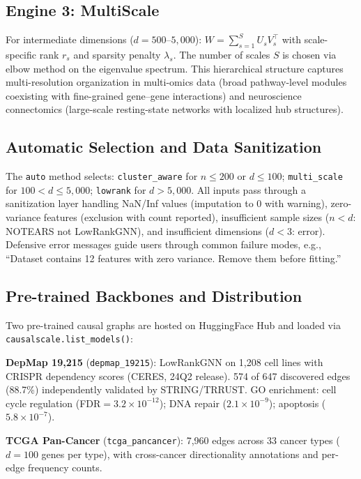 \documentclass[sigconf,review]{acmart}
\begin{document}
\subsection{Engine 3: MultiScale}

For intermediate dimensions ($d=500$--$5{,}000$): $W=\sum_{s=1}^{S} U_s V_s^\top$ with scale-specific rank $r_s$ and sparsity penalty $\lambda_s$. The number of scales $S$ is chosen via elbow method on the eigenvalue spectrum. This hierarchical structure captures multi-resolution organization in multi-omics data (broad pathway-level modules coexisting with fine-grained gene--gene interactions) and neuroscience connectomics (large-scale resting-state networks with localized hub structures).

\subsection{Automatic Selection and Data Sanitization}

The \texttt{auto} method selects: \texttt{cluster\_aware} for $n\le200$ or $d\le100$; \texttt{multi\_scale} for $100<d\le5{,}000$; \texttt{lowrank} for $d>5{,}000$. All inputs pass through a sanitization layer handling NaN/Inf values (imputation to 0 with warning), zero-variance features (exclusion with count reported), insufficient sample sizes ($n<d$: NOTEARS not LowRankGNN), and insufficient dimensions ($d<3$: error). Defensive error messages guide users through common failure modes, e.g., ``Dataset contains 12 features with zero variance. Remove them before fitting.''

\subsection{Pre-trained Backbones and Distribution}

Two pre-trained causal graphs are hosted on HuggingFace Hub and loaded via \texttt{causalscale.list\_models()}:

\textbf{DepMap 19,215} (\texttt{depmap\_19215}): LowRankGNN on 1,208 cell lines with CRISPR dependency scores (CERES, 24Q2 release). 574 of 647 discovered edges (88.7\%) independently validated by STRING/TRRUST. GO enrichment: cell cycle regulation (FDR$=3.2\times10^{-12}$); DNA repair ($2.1\times10^{-9}$); apoptosis ($5.8\times10^{-7}$).

\textbf{TCGA Pan-Cancer} (\texttt{tcga\_pancancer}): 7,960 edges across 33 cancer types ($d=100$ genes per type), with cross-cancer directionality annotations and per-edge frequency counts.
\end{document}
